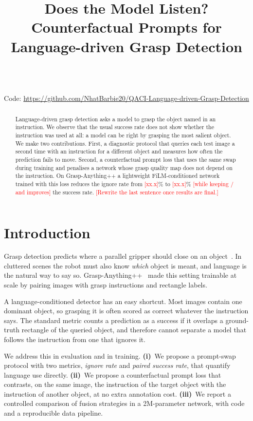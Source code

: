 \documentclass[10pt,twocolumn,letterpaper]{article}
\title{Does the Model Listen? Counterfactual Prompts for Language-driven Grasp Detection}
\author{\todo{First Last}\\
\todo{Affiliation}\\
{\tt\small \todo{email}}\\
{\small Code: \url{https://github.com/NhatBarbie20/QACI-Language-driven-Grasp-Detection}}
}
\newcommand{\todo}[1]{\textcolor{red}{[#1]}}
\begin{document}
\maketitle

\begin{abstract}
Language-driven grasp detection asks a model to grasp the object named in an
instruction. We observe that the usual success rate does not show whether the
instruction was used at all: a model can be right by grasping the most salient
object. We make two contributions. First, a diagnostic protocol that queries
each test image a second time with an instruction for a different object and
measures how often the prediction fails to move. Second, a counterfactual prompt
loss that uses the same swap during training and penalises a network whose
grasp quality map does not depend on the instruction. On Grasp-Anything++ a
lightweight FiLM-conditioned network trained with this loss reduces the ignore
rate from \todo{xx.x}\% to \todo{xx.x}\% \todo{while keeping / and improves} the
success rate. \todo{Rewrite the last sentence once results are final.}
\end{abstract}

\section{Introduction}
Grasp detection predicts where a parallel gripper should close on an
object~\cite{jiang2011rectangle,morrison2018ggcnn,kumra2020grconvnet}.
In cluttered scenes the robot must also know \emph{which} object is meant, and
language is the natural way to say so. Grasp-Anything++~\cite{vuong2024lgd}
made this setting trainable at scale by pairing images with grasp instructions
and rectangle labels.

A language-conditioned detector has an easy shortcut. Most images contain one
dominant object, so grasping it is often scored as correct whatever the
instruction says. The standard metric counts a prediction as a success if it
overlaps a ground-truth rectangle of the queried object, and therefore cannot
separate a model that follows the instruction from one that ignores it.

We address this in evaluation and in training.
\textbf{(i)}~We propose a prompt-swap protocol with two metrics, \emph{ignore
rate} and \emph{paired success rate}, that quantify language use directly.
\textbf{(ii)}~We propose a counterfactual prompt loss that contrasts, on the
same image, the instruction of the target object with the instruction of
another object, at no extra annotation cost.
\textbf{(iii)}~We report a controlled comparison of fusion strategies in a
2M-parameter network, with code and a reproducible data pipeline.
\end{document}
